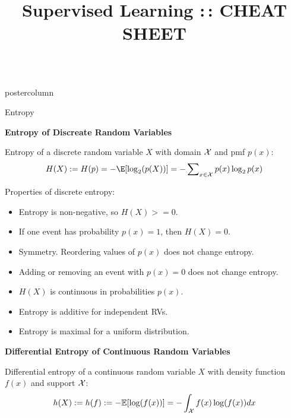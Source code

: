 \documentclass{beamer}
\title{Supervised Learning :\,: CHEAT SHEET} %
\newlength{\columnheight} %
\begin{document}
\begin{frame}[fragile]{}
\begin{columns}
	\begin{column}{.31\textwidth}
		\begin{beamercolorbox}[center]{postercolumn}
			\begin{minipage}{.98\textwidth}
				\parbox[t][\columnheight]{\textwidth}{

				\begin{myblock}{Entropy}

                \begin{codebox}
                  \textbf{Entropy of Discreate Random Variables}
                \end{codebox}
								
								Entropy of a discrete random variable $X$ with domain $\mathcal{X}$ and pmf $p(x)$:
								$$
										H(X) := H(p) = - \E[\log_2(p(X))] = -\sum\nolimits_{x \in \Xspace} p(x) \log_2 p(x) 
								$$
								
                Properties of discrete entropy:
								\begin{itemize}[$\bullet$]
            \setlength{\itemindent}{+.3in}
									\item Entropy is non-negative, so $H(X) >= 0$.
									\item If one event has probability $p(x) = 1$, then $H(X)=0$. 
									\item Symmetry. Reordering values of $p(x)$ does not change entropy.
									\item Adding or removing an event with $p(x)=0$ does not change entropy.
									\item $H(X)$ is continuous in probabilities $p(x)$.
									\item Entropy is additive for independent RVs.
									\item Entropy is maximal for a uniform distribution.
								\end{itemize}


                \begin{codebox}
                  \textbf{Differential Entropy of Continuous Random Variables}
                \end{codebox}

                Differential entropy of a continuous random variable $X$ with density function $f(x)$ and support $\mathcal{X}$:				
									$$ h(X) := h(f) := - \mathbb{E}[\log(f(x))] = - \int_{\mathcal{X}} f(x) \log(f(x)) dx $$
				


\end{myblock}}
\end{minipage}
\end{beamercolorbox}
\end{column}
\end{columns}
\end{frame}
\end{document}
